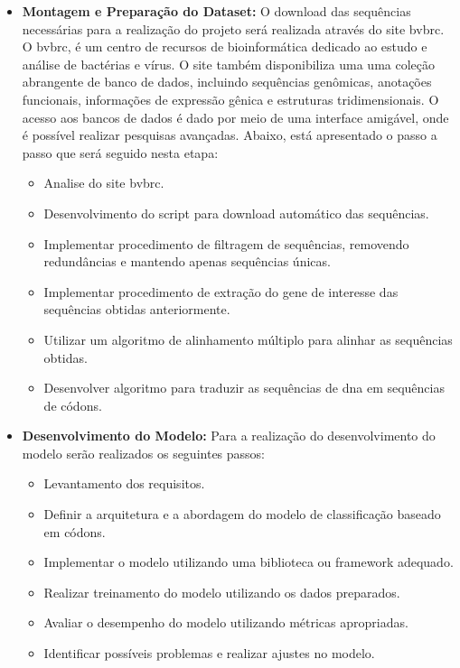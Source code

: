 \begin{itemize}
  \item \textbf{Montagem e Preparação do Dataset:} O download das sequências necessárias para a realização do projeto será realizada através do site \gls{bvbrc}. O \gls{bvbrc}, é um centro de recursos de bioinformática dedicado ao estudo e análise de bactérias e vírus. O site também disponibiliza uma uma coleção abrangente de banco de dados, incluindo sequências genômicas, anotações funcionais, informações de expressão gênica e estruturas tridimensionais. O acesso aos bancos de dados é dado por meio de uma interface amigável, onde é possível realizar pesquisas avançadas.
  Abaixo, está apresentado o passo a passo que será seguido nesta etapa:
  \begin{itemize}
    \item Analise do site \gls{bvbrc}.
    \item Desenvolvimento do script para download automático das sequências.
    \item Implementar procedimento de filtragem de sequências, removendo redundâncias e mantendo apenas sequências únicas.
    \item Implementar procedimento de extração do gene de interesse das sequências obtidas anteriormente.
    \item Utilizar um algoritmo de alinhamento múltiplo para alinhar as sequências obtidas.
    \item Desenvolver algoritmo para traduzir as sequências de \gls{dna} em sequências de códons.
  \end{itemize}

  \item \textbf{Desenvolvimento do Modelo:} Para a realização do desenvolvimento do modelo serão realizados os seguintes passos:
        \begin{itemize}
          \item Levantamento dos requisitos.
          \item Definir a arquitetura e a abordagem do modelo de classificação baseado em códons.
          \item Implementar o modelo utilizando uma biblioteca ou framework adequado.
          \item Realizar treinamento do modelo utilizando os dados preparados.
          \item Avaliar o desempenho do modelo utilizando métricas apropriadas.
          \item Identificar possíveis problemas e realizar ajustes no modelo.
        \end{itemize}


\end{itemize}
